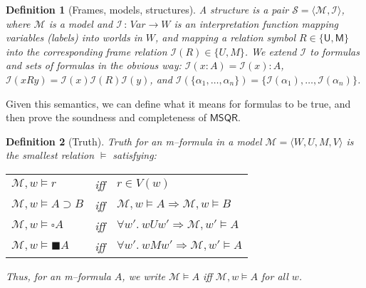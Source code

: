 \documentclass[times, 10pt]{article}
\newcommand{\varimp}{\supset}
\newcommand{\MSQR}{\textsf{MSQR}}
\newcommand{\measB}{\blacksquare}
\newcommand{\uniB}{\square}
\newcommand{\Un}{\textsf{U}}
\newcommand{\Me}{\textsf{M}}
\newtheorem{definition}{Definition}
\renewcommand{\Un}{\mathsf{U}}
\renewcommand{\Me}{\mathsf{M}}
\newcommand{\I}{\mathscr{I}}
\begin{document}
\begin{definition}[Frames, models, structures]
A \emph{structure} 
is a pair $\mathscr{S}=\langle\mathscr{M}, \I\rangle$, where 
$\mathscr{M}$ is a model and $\I\, :\, \mathit{Var} \rightarrow  W$ is an interpretation function mapping 
variables (labels) into worlds in $W$, and mapping a relation symbol $R \in \{\Un,\Me\}$
into the corresponding frame relation $\I(R) \in \{U,M\}$. We extend $\I$ to 
formulas and sets of formulas in the obvious way: $\I(x:A)=\I(x):A$,
$\I(x R y) = \I(x) \I(R) \I(y)$, and $\I(\{\alpha_1,\ldots,\alpha_n\})=\{\I(\alpha_1),\ldots,\I(\alpha_n)\}$. 
\end{definition}

Given this semantics, we can define what it means for formulas to be true, and then prove
the soundness and completeness of $\MSQR$.

\begin{definition}[Truth]\label{def:truth}
  \emph{Truth} for an m--formula in a model $\mathscr{M} =
  \langle W, U, M, V\rangle$
  is the smallest relation $\vDash$ satisfying:
  \begin{center}
    \begin{tabular}{lll}
    $\mathscr{M},w \vDash r$ & iff & $r \in V(w)$ \\
    $\mathscr{M},w \vDash A \varimp B$ & iff & $\mathscr{M},w \vDash A \Longrightarrow
    \mathscr{M},w \vDash B$ \\
    $\mathscr{M},w\vDash \uniB A$ & iff & 
    $\forall w'.\  w U w' \Longrightarrow \mathscr{M},w'\vDash A$\\
    $\mathscr{M},w\vDash \measB A$ & iff & 
    $\forall w'.\ w M w' \Longrightarrow \mathscr{M}, w'\vDash A$ \\
    \end{tabular}
  \end{center}
  Thus, for an m--formula $A$, we write $\mathscr{M} \vDash A$  iff 
  $\mathscr{M},w \vDash A$ for all $w$. 


\end{definition}
\end{document}
